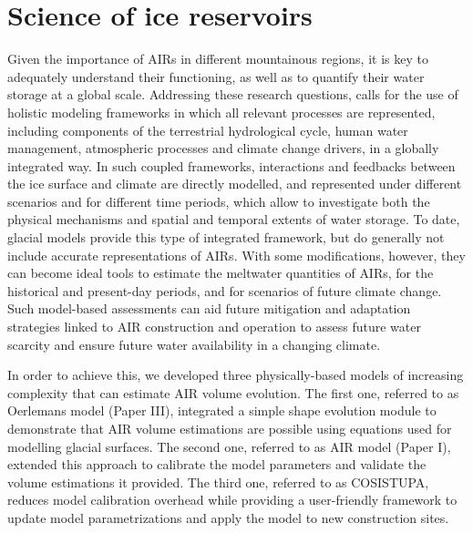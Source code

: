 \chapter{Science of ice reservoirs}
\label{chap:science}


Given the importance of \ac{AIRs} in different mountainous regions, it is key to adequately understand their
functioning, as well as to quantify their water storage at a global scale. Addressing these research questions,
calls for the use of holistic modeling frameworks in which all relevant processes are represented, including
components of the terrestrial hydrological cycle, human water management, atmospheric processes and climate
change drivers, in a globally integrated way. In such coupled frameworks, interactions and feedbacks between the
ice surface and climate are directly modelled, and represented under different scenarios and for different time
periods, which allow to investigate both the physical mechanisms and spatial and temporal extents of water
storage. To date, glacial models provide this type of integrated framework, but do generally not include
accurate representations of \ac{AIRs}. With some modifications, however, they can become ideal tools to estimate
the meltwater quantities of \ac{AIRs}, for the historical and present-day periods, and for scenarios of future
climate change. Such model-based assessments can aid future mitigation and adaptation strategies linked to AIR
construction and operation to assess future water scarcity and ensure future water availability in a changing
climate.

In order to achieve this, we developed three physically-based models of increasing complexity that can estimate
AIR volume evolution. The first one, referred to as Oerlemans model (Paper III), integrated a simple shape
evolution module to demonstrate that AIR volume estimations are possible using equations used for modelling
glacial surfaces. The second one, referred to as AIR model (Paper I), extended this approach to calibrate the
model parameters and validate the volume estimations it provided. The third one, referred to as COSISTUPA,
reduces model calibration overhead while providing a user-friendly framework to update model parametrizations
and apply the model to new construction sites. 

